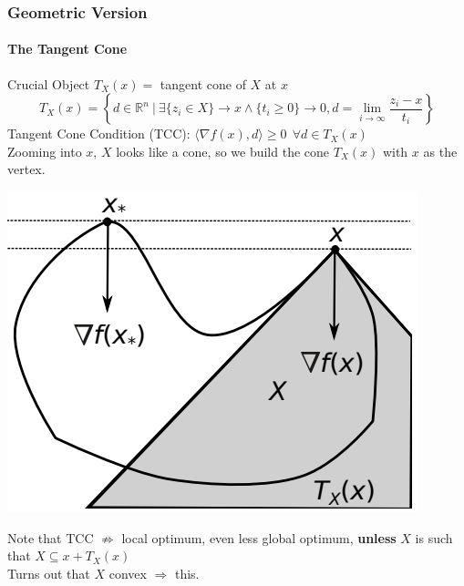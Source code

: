 \documentclass[10pt]{report}
\begin{document}
\subsubsection{Geometric Version}
\paragraph{The Tangent Cone} Crucial Object $T_X(x) =$ tangent cone of $X$ at $x$
$$T_X(x) = \left\{d\in \mathbb{R}^n\:|\:\exists\{z_i\in X\}\rightarrow x\wedge \{t_i\geq 0\}\rightarrow 0, d=\lim_{i\to\infty}\frac{z_i-x}{t_i}\right\}$$
Tangent Cone Condition (TCC): $\langle\nabla f(x),d\rangle \geq 0\:\:\forall d\in T_X(x)$\\Zooming into $x$, $X$ looks like a cone, so we build the cone $T_X(x)$ with $x$ as the vertex.
\begin{center}
	\includegraphics[scale=0.75]{9.png}
\end{center}
Note that TCC $\not\Rightarrow$ local optimum, even less global optimum, \textbf{unless} $X$ is such that $X\subseteq x + T_X(x)$\\
Turns out that $X$ convex $\Rightarrow$ this.
\end{document}
